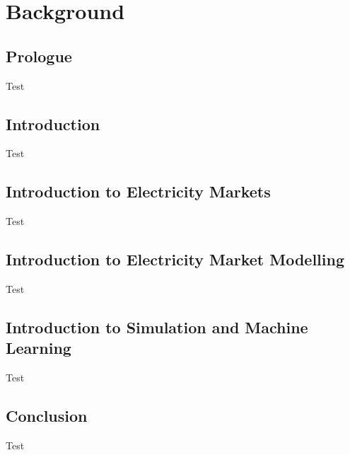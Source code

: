 
\chapter{Background}

\ifpdf
    \graphicspath{{Chapter2/Figs/Raster/}{Chapter2/Figs/PDF/}{Chapter2/Figs/}}
\else
    \graphicspath{{Chapter2/Figs/Vector/}{Chapter2/Figs/}}
\fi


\section{Prologue}

Test

\section{Introduction}

Test

\section{Introduction to Electricity Markets}

Test

\section{Introduction to Electricity Market Modelling}

Test

\section{Introduction to Simulation and Machine Learning}

Test

\section{Conclusion}

Test
